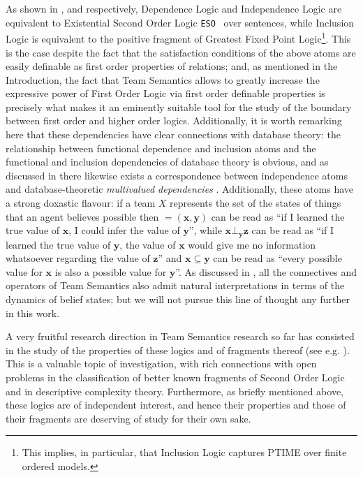 \documentclass{article}
\theoremstyle{definition}
\newcommand{\tuple}{\mathbf}
\newcommand{\ESO}{\texttt{ESO}}
\begin{document}
As shown in \cite{vaananen07}, \cite{gradel13} and \cite{gallhella13} respectively, Dependence Logic and Independence Logic are equivalent to Existential Second Order Logic \ESO~ over sentences, while Inclusion Logic is equivalent to the positive fragment of Greatest Fixed Point Logic\footnote{This implies, in particular, that Inclusion Logic captures PTIME over finite ordered models.}.  This is the case despite the fact that the satisfaction conditions of the above atoms are easily definable as first order properties of relations; and, as mentioned in the Introduction, the fact that Team Semantics allows to greatly increase the expressive power of First Order Logic via first order definable properties is precisely what makes it an eminently suitable tool for the study of the boundary between first order and higher order logics. Additionally, it is worth remarking here that these dependencies have clear connections with database theory: the relationship between functional dependence and inclusion atoms and the functional \cite{codd72, armstrong74} and inclusion \cite{casanova82} dependencies of database theory is obvious, and as discussed in \cite{engstrom12} there likewise exists a correspondence between independence atoms and database-theoretic \emph{multivalued dependencies} \cite{fagin77}. Additionally, these atoms have a strong doxastic flavour: if a team $X$ represents the set of the states of things that an agent believes possible then $=\!\!(\tuple x, \tuple y)$ can be read as ``if I learned the true value of $\tuple x$, I could infer the value of $\tuple y$'', while $\tuple x \bot_\tuple y \tuple z$ can be read as ``if I learned the true value of $\tuple y$, the value of $\tuple x$ would give me no information whatsoever regarding the value of $\tuple z$'' and $\tuple x \subseteq \tuple y$ can be read as ``every possible value for $\tuple x$ is also a possible value for $\tuple y$''. As discussed in \cite{galliani2015doxastic}, all the connectives and operators of Team Semantics also admit natural interpretations in terms of the dynamics of belief states; but we will not pursue this line of thought any further in this work.

A very fruitful research direction in Team Semantics research so far has consisted in the study of the properties of these logics and of fragments thereof (see e.g. \cite{kontinen2013coherence,durand2012hierarchies,galliani12,gallhella13,galliani13b,kontinen2013axiomatizing, hannula2015axiomatizing, hannula2018hierarchies,durand2016expressivity}). This is a valuable topic of investigation, with rich connections with open problems in the classification of better known fragments of Second Order Logic and in descriptive complexity theory. Furthermore, as briefly mentioned above, these logics are of independent interest, and hence their properties and those of their fragments are deserving of study for their own sake. 
\end{document}
